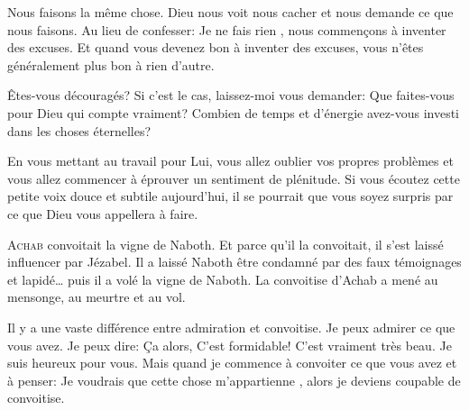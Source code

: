 Nous faisons la même chose. Dieu nous voit nous cacher
 et nous demande ce que nous faisons.
 Au lieu de confesser: \Og Je ne fais rien \Fg{},
 nous commen\c{c}ons à inventer des excuses.
 Et quand vous devenez bon à inventer des excuses,
 vous n'êtes généralement plus bon à rien d'autre. 

Êtes-vous découragés? Si c'est le cas, laissez-moi vous demander:
 Que faites-vous pour Dieu qui compte vraiment?
 Combien de temps et d'énergie avez-vous investi dans les choses éternelles?


En vous mettant au travail pour Lui, vous allez oublier vos propres problèmes
 et vous allez commencer à éprouver un sentiment de plénitude.
 Si vous écoutez cette petite voix douce et subtile aujourd'hui,
 il se pourrait que vous soyez surpris par ce que Dieu vous appellera à faire. 

\dvrule






\lettrine{A}{chab} convoitait la vigne de Naboth.
 Et parce qu'il la convoitait, il s'est laissé influencer par Jézabel.
 Il a laissé Naboth être condamné par des faux témoignages et lapidé\dots{}
 puis il a volé la vigne de Naboth.
 La convoitise d'Achab a mené au mensonge, au meurtre et au vol.

Il y a une vaste différence entre admiration et convoitise.
 Je peux admirer ce que vous avez. Je peux dire:
 \Og Ça alors, C'est formidable! C'est vraiment très beau.
 Je suis heureux pour vous. \Fg{}
 Mais quand je commence à convoiter ce que vous avez et à penser:
 \Og Je voudrais que cette chose m'appartienne \Fg{},
 alors je deviens coupable de convoitise. 

